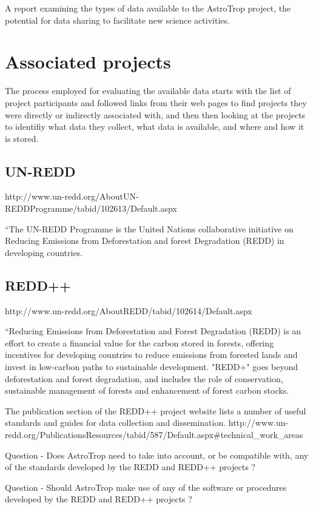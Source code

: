 \documentclass{article}
\begin{document}
A report examining the types of data available to the AstroTrop project, the
potential for data sharing to facilitate new science activities.   

\section{Associated projects}

The process employed for evaluating the available data starts with the list of
project participants and followed links from their web pages to find projects
they were directly or indirectly associated with, and then then looking at the
projects to identifiy what data they collect, what data is available, and where
and how it is stored.
  
\subsection{UN-REDD}
http://www.un-redd.org/AboutUN-REDDProgramme/tabid/102613/Default.aspx

``The UN-REDD Programme is the United Nations collaborative initiative on Reducing
Emissions from Deforestation and forest Degradation (REDD) in developing countries. 

\subsection{REDD++}
http://www.un-redd.org/AboutREDD/tabid/102614/Default.aspx

``Reducing Emissions from Deforestation and Forest Degradation (REDD) is an
effort to create a financial value for the carbon stored in forests, offering
incentives for developing countries to reduce emissions from forested lands	and
invest in low-carbon paths to sustainable development. "REDD+" goes beyond
deforestation and forest degradation, and includes the role of conservation,
sustainable management of forests and enhancement of forest carbon stocks.

The publication section of the REDD++ project website lists a number of useful
standards and guides for data collection and dissemination.
http://www.un-redd.org/PublicationsResources/tabid/587/Default.aspx#technical_work_areas

Question - Does AstroTrop need to take into account, or be compatible with, any
of the standards developed by the REDD and REDD++ projects ?

Question - Should AstroTrop make use of any of the software or
procedures developed by the REDD and REDD++ projects ?
\end{document}
